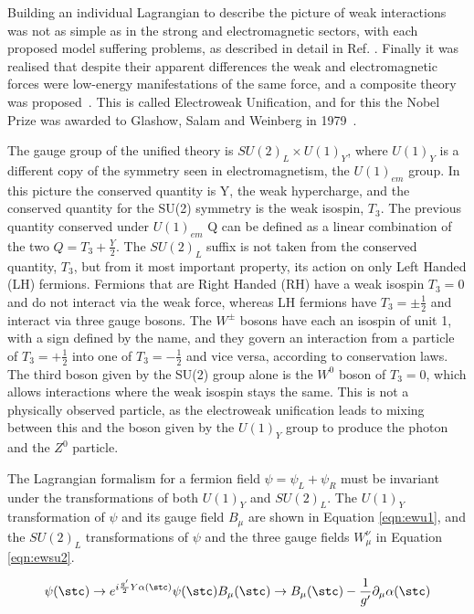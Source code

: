 Building an individual Lagrangian to describe the picture of weak interactions was not as simple as in the strong and electromagnetic sectors, with each proposed model suffering problems, as described in detail in Ref. \cite{HerreroSM}. Finally it was realised that despite their apparent differences the weak and electromagnetic forces were low-energy manifestations of the same force, and a composite theory was proposed~\cite{Glashow}. This is called Electroweak Unification, and for this the Nobel Prize was awarded to Glashow, Salam and Weinberg in 1979~\cite{Breaking}. 

The gauge group of the unified theory is $SU(2)_{L} \times U(1)_{Y}$, where $U(1)_{Y}$ is a different copy of the symmetry seen in electromagnetism, the $U(1)_{em}$ group. In this picture the conserved quantity is Y, the weak hypercharge, and the conserved quantity for the SU(2) symmetry is the weak isospin, $T_{3}$. The previous quantity conserved under $U(1)_{em}$ Q can be defined as a linear combination of the two $Q = T_{3} + \frac{Y}{2}$.  The $SU(2)_{L}$ suffix is not taken from the conserved quantity, $T_{3}$, but from it most important property, its action on only Left Handed (LH) fermions. Fermions that are Right Handed (RH) have a weak isospin $T_{3} = 0$ and do not interact via the weak force, whereas LH fermions have $T_{3} =  \pm \frac{1}{2}$ and interact via three gauge bosons. The $W^{\pm}$ bosons have each an isospin of unit 1, with a sign defined by the name, and they govern an interaction from a particle of $T_{3}=+\frac{1}{2}$ into one of $T_{3}=-\frac{1}{2}$ and vice versa, according to conservation laws. The third boson given by the SU(2) group alone is the $W^{0}$ boson of $T_{3}=0$, which allows interactions where the weak isospin stays the same. This is not a physically observed particle, as the electroweak unification leads to mixing between this and the boson given by the $U(1)_{Y}$ group to produce the photon and the $Z^{0}$ particle.


The Lagrangian formalism for a fermion field $\psi = \psi_{L} + \psi_{R}$ must be invariant under the transformations of both $U(1)_{Y}$ and $SU(2)_{L}$. The $U(1)_{Y}$ transformation of $\psi$ and its gauge field $B_{\mu}$ are shown in Equation \ref{eqn:ewu1}, and the $SU(2)_{L}$ transformations of $\psi$ and the three gauge fields $W^{\nu}_{\mu}$ in Equation \ref{eqn:ewsu2}.

\begin{equation}
\psi(\stc) \rightarrow e^{i\frac{g'}{2}Y\alpha (\stc)}\psi(\stc) \\ B_{\mu}(\stc) \rightarrow B_{\mu}(\stc) - \frac{1}{g'}\partial_{\mu}\alpha(\stc)
\label{eqn:ewu1}
\end{equation}

